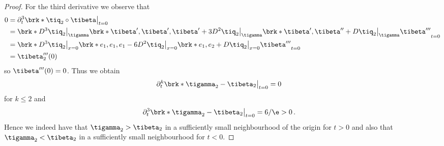 \begin{proof}
  For the third derivative we observe that
  \begin{align*}
    0&=\partial_t^3\brk*{\tiq_2\circ\tibeta}\big\vert_{t=0} \\
    &=\brk*{D^3\tiq_2\big\vert_{\tigamma}\brk*{\tibeta',\tibeta',\tibeta'}
    +3D^2\tiq_2\big\vert_{\tigamma}\brk*{\tibeta',\tibeta''}
    +D\tiq_2\big\vert_{\tigamma}\tibeta'''}_{t=0} \\
    &=\brk*{D^3\tiq_2\big\vert_{x=0}\brk*{e_1,e_1,e_1}
    -6D^2\tiq_2\big\vert_{x=0}\brk*{e_1,e_2}
    +D\tiq_2\big\vert_{x=0}\tibeta'''}_{t=0} \\
    &=\tibeta_2'''(0)
  \end{align*}
  so $\tibeta'''(0)=0$.
  Thus we obtain
  \begin{align*}
    \partial_t^k\brk*{\tigamma_2-\tibeta_2}\big\vert_{t=0}&=0 
  \end{align*}
  for $k\leq2$ and
  \begin{align*}
    \partial_t^3\brk*{\tigamma_2-\tibeta_2}\big\vert_{t=0}&=6/\e>0\,.
  \end{align*}
  Hence we indeed have that $\tigamma_2>\tibeta_2$ in a sufficiently small neighbourhood of the origin for $t>0$
  and also that  $\tigamma_2<\tibeta_2$ in a sufficiently small neighbourhood for $t<0$.


\end{proof}
